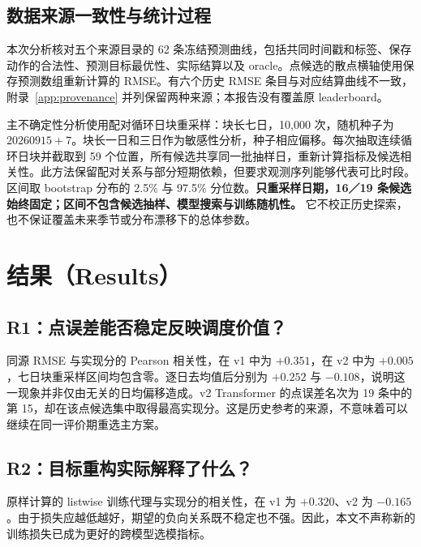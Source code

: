 \documentclass[11pt,a4paper]{article}
\begin{document}
\subsection{数据来源一致性与统计过程}
本次分析核对五个来源目录的 62 条冻结预测曲线，包括共同时间戳和标签、保存动作的合法性、预测目标最优性、实际结算以及 oracle。点候选的散点横轴使用保存预测数组重新计算的 RMSE。有六个历史 RMSE 条目与对应结算曲线不一致，附录~\ref{app:provenance} 并列保留两种来源；本报告没有覆盖原 leaderboard。

主不确定性分析使用配对循环日块重采样：块长七日，10,000 次，随机种子为 $20260915+7$。块长一日和三日作为敏感性分析，种子相应偏移。每次抽取连续循环日块并截取到 59 个位置，所有候选共享同一批抽样日，重新计算指标及候选相关性。此方法保留配对关系与部分短期依赖，但要求观测序列能够代表可比时段。区间取 bootstrap 分布的 2.5\% 与 97.5\% 分位数。\textbf{只重采样日期，16／19 条候选始终固定；区间不包含候选抽样、模型搜索与训练随机性。} 它不校正历史探索，也不保证覆盖未来季节或分布漂移下的总体参数。
\FloatBarrier

\section{结果（Results）}\label{sec:results}
\subsection{R1：点误差能否稳定反映调度价值？}
同源 RMSE 与实现分的 Pearson 相关性，在 v1 中为 $+0.351$，在 v2 中为 $+0.005$，七日块重采样区间均包含零。逐日去均值后分别为 $+0.252$ 与 $-0.108$，说明这一现象并非仅由无关的日均偏移造成。v2 Transformer 的点误差名次为 19 条中的第 15，却在该点候选集中取得最高实现分。这是历史参考的来源，不意味着可以继续在同一评价期重选主方案。

\FloatBarrier
\subsection{R2：目标重构实际解释了什么？}
\EqDiagnostic
{}
原样计算的 listwise 训练代理与实现分的相关性，在 v1 为 $+0.320$、v2 为 $-0.165$。由于损失应越低越好，期望的负向关系既不稳定也不强。因此，本文不声称新的训练损失已成为更好的跨模型选模指标。
\end{document}
